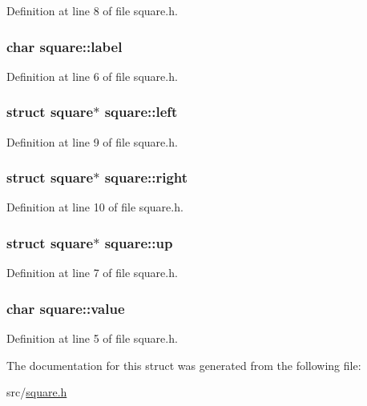 Definition at line 8 of file square.\-h.

\hypertarget{structsquare_a07e1733aa998224f5efb29084efc68c9}{
\subsubsection[{label}]{\setlength{\rightskip}{0pt plus 5cm}char square\-::label}}\label{structsquare_a07e1733aa998224f5efb29084efc68c9}


Definition at line 6 of file square.\-h.

\hypertarget{structsquare_ac2109f761e5d281cbd9555b31337ff42}{
\subsubsection[{left}]{\setlength{\rightskip}{0pt plus 5cm}struct {\bf square}$\ast$ square\-::left}}\label{structsquare_ac2109f761e5d281cbd9555b31337ff42}


Definition at line 9 of file square.\-h.

\hypertarget{structsquare_abc1f49545672858dc057027d5e09b74e}{
\subsubsection[{right}]{\setlength{\rightskip}{0pt plus 5cm}struct {\bf square}$\ast$ square\-::right}}\label{structsquare_abc1f49545672858dc057027d5e09b74e}


Definition at line 10 of file square.\-h.

\hypertarget{structsquare_a7b17203c38eb644726b2cee9582c3360}{
\subsubsection[{up}]{\setlength{\rightskip}{0pt plus 5cm}struct {\bf square}$\ast$ square\-::up}}\label{structsquare_a7b17203c38eb644726b2cee9582c3360}


Definition at line 7 of file square.\-h.

\hypertarget{structsquare_a58f1a8b7f7f19866c82fd70e497895f6}{
\subsubsection[{value}]{\setlength{\rightskip}{0pt plus 5cm}char square\-::value}}\label{structsquare_a58f1a8b7f7f19866c82fd70e497895f6}


Definition at line 5 of file square.\-h.



The documentation for this struct was generated from the following file\-:\begin{DoxyCompactItemize}
\item 
src/\hyperlink{square_8h}{square.\-h}\end{DoxyCompactItemize}
